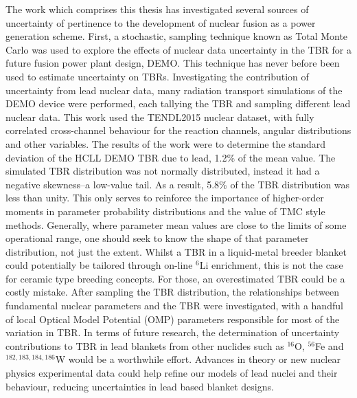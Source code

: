 The work which comprises this thesis has investigated several sources of uncertainty of pertinence to the development of nuclear fusion as a power generation scheme. First, a stochastic, sampling technique known as Total Monte Carlo was used to explore the effects of nuclear data uncertainty in the TBR for a future fusion power plant design, DEMO. This technique has never before been used to estimate uncertainty on TBRs. Investigating the contribution of uncertainty from lead nuclear data, many radiation transport simulations of the DEMO device were performed, each tallying the TBR and sampling different lead nuclear data. This work used the TENDL2015 nuclear dataset, with fully correlated cross-channel behaviour for the reaction channels, angular distributions and other variables. The results of the work were to determine the standard deviation of the HCLL DEMO TBR due to lead, 1.2\% of the mean value. The simulated TBR distribution was not normally distributed, instead it had a negative skewness--a low-value tail. As a result, 5.8\% of the TBR distribution was less than unity. This only serves to reinforce the importance of higher-order moments in parameter probability distributions and the value of TMC style methods. Generally, where parameter mean values are close to the limits of some operational range, one should seek to know the shape of that parameter distribution, not just the extent. Whilst a TBR in a liquid-metal breeder blanket could potentially be tailored through on-line $^{6}$Li enrichment, this is not the case for ceramic type breeding concepts. For those, an overestimated TBR could be a costly mistake. After sampling the TBR distribution, the relationships between fundamental nuclear parameters and the TBR were investigated, with a handful of local Optical Model Potential (OMP) parameters responsible for most of the variation in TBR. In terms of future research, the determination of uncertainty contributions to TBR in lead blankets from other nuclides such as $^{16}$O, $^{56}$Fe and $^{182,183,184,186}$W would be a worthwhile effort. Advances in theory or new nuclear physics experimental data could help refine our models of lead nuclei and their behaviour, reducing uncertainties in lead based blanket designs.

